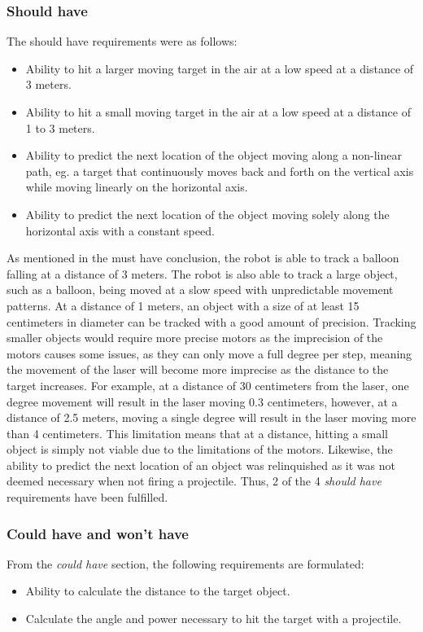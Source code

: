 \subsubsection{Should have}
The should have requirements were as follows:
\begin{itemize}
	\item Ability to hit a larger moving target in the air at a low speed at a distance of 3 meters.
	\item Ability to hit a small moving target in the air at a low speed at a distance of 1 to 3 meters.
	\item Ability to predict the next location of the object moving along a non-linear path, eg{.} a target that continuously moves back and forth on the vertical axis while moving linearly on the horizontal axis.
	\item Ability to predict the next location of the object moving solely along the horizontal axis with a constant speed.
\end{itemize}

As mentioned in the must have conclusion, the robot is able to track a balloon falling at a distance of 3 meters.
The robot is also able to track a large object, such as a balloon, being moved at a slow speed with unpredictable movement patterns.
At a distance of 1 meters, an object with a size of at least 15 centimeters in diameter can be tracked with a good amount of precision.
Tracking smaller objects would require more precise motors as the imprecision of the motors causes some issues, as they can only move a full degree per step, meaning the movement of the laser will become more imprecise as the distance to the target increases.
For example, at a distance of 30 centimeters from the laser, one degree movement will result in the laser moving 0.3 centimeters, however, at a distance of 2.5 meters, moving a single degree will result in the laser moving more than 4 centimeters.
This limitation means that at a distance, hitting a small object is simply not viable due to the limitations of the motors.
Likewise, the ability to predict the next location of an object was relinquished as it was not deemed necessary when not firing a projectile.
Thus, 2 of the 4 \textit{should have} requirements have been fulfilled.

\subsubsection{Could have and won't have}
From the \textit{could have} section, the following requirements are formulated:
\begin{itemize}
	\item Ability to calculate the distance to the target object.
	\item Calculate the angle and power necessary to hit the target with a projectile.
\end{itemize}

